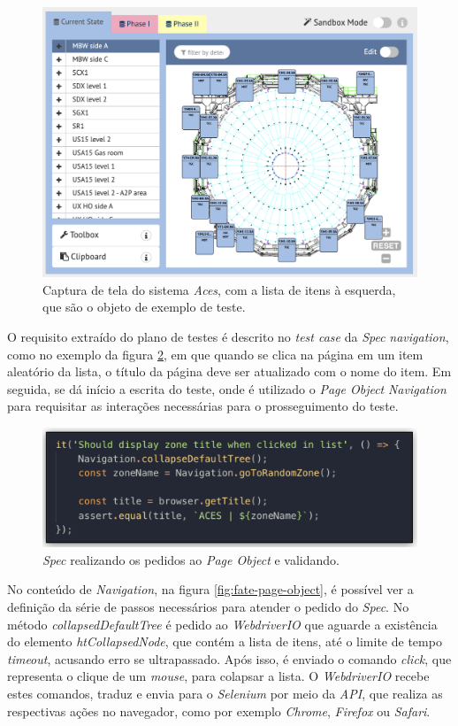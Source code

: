 \begin{figure}[H]
    \centering
    \includegraphics[width=13cm]{source/4-solucao/images/aces-example.png}
    \caption{Captura de tela do sistema \emph{Aces}, com a lista de itens à esquerda, que são o objeto de exemplo de teste.}
    \label{fig:aces-example}
\end{figure}

O requisito extraído do plano de testes é descrito no \emph{test case} da \emph{Spec} \emph{navigation}, como no exemplo da figura \ref{fig:fate-spec}, em que quando se clica na página em um item aleatório da lista, o título da página deve ser atualizado com o nome do item. Em seguida, se dá início a escrita do teste, onde é utilizado o \emph{Page Object} \emph{Navigation} para requisitar as interações necessárias para o prosseguimento do teste.

\begin{figure}[H]
    \centering
    \includegraphics[width=13cm]{source/4-solucao/images/fate-spec.png}
    \caption{\emph{Spec} realizando os pedidos ao \emph{Page Object} e validando.}
    \label{fig:fate-spec}
\end{figure}

No conteúdo de \emph{Navigation}, na figura \ref{fig:fate-page-object}, é possível ver a definição da série de passos necessários para atender o pedido do \emph{Spec}. No método \emph{collapsedDefaultTree} é pedido ao \emph{WebdriverIO} que aguarde a existência do elemento \emph{htCollapsedNode}, que contém a lista de itens, até o limite de tempo \emph{timeout}, acusando erro se ultrapassado. Após isso, é enviado o comando \emph{click}, que representa o clique de um \emph{mouse}, para colapsar a lista. O \emph{WebdriverIO} recebe estes comandos, traduz e envia para o \emph{Selenium} por meio da \emph{API}, que realiza as respectivas ações no navegador, como por exemplo \emph{Chrome}, \emph{Firefox} ou \emph{Safari}.

